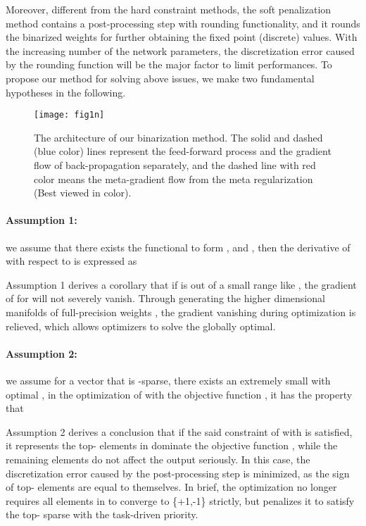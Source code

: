 \documentclass[runningheads]{llncs}
\begin{document}
Moreover, different from the hard constraint methods,
the soft penalization method contains a post-processing step with rounding functionality,
and it rounds the binarized weights for further obtaining the fixed point (discrete) values.
With the increasing number of the network parameters,
the discretization error caused by the rounding function will be the major factor to limit performances.
To propose our method for solving above issues, we make two fundamental hypotheses in the following.

\begin{figure}[t]
  \centering
  \texttt{[image: fig1n]}
  \caption{The architecture of our binarization method. The solid and dashed (blue color) lines represent the feed-forward process and the gradient flow of back-propagation separately, and the dashed line with red color means the meta-gradient flow from the meta regularization (Best viewed in color).}\label{fig:pipeline}
\end{figure}

\paragraph{\textbf{Assumption 1}:}
we assume that there exists the functional  to form ,
and ,
then the derivative of  with respect to  is expressed as





Assumption 1 derives a corollary that
if  is out of a small range like ,
the gradient of  for  will not severely vanish.
Through generating the higher dimensional manifolds of full-precision weights ,
the gradient vanishing during optimization is relieved,
which allows optimizers to solve the globally optimal.

\paragraph{\textbf{Assumption 2}:} we assume for a vector  that is -sparse,
there exists an extremely small  with optimal ,
in the optimization of  with the objective function ,
it has the property that



Assumption 2 derives a conclusion that
if the said constraint of  with  is satisfied,
it represents the top- elements in  dominate the objective function ,
while the remaining elements do not affect the output seriously.
In this case, the discretization error caused by the post-processing step is minimized,
as the sign of top- elements are equal to themselves.
In brief, the optimization no longer requires all elements in  to converge to \{+1,-1\} strictly,
but penalizes it to satisfy the top- sparse with the task-driven priority.
\end{document}
